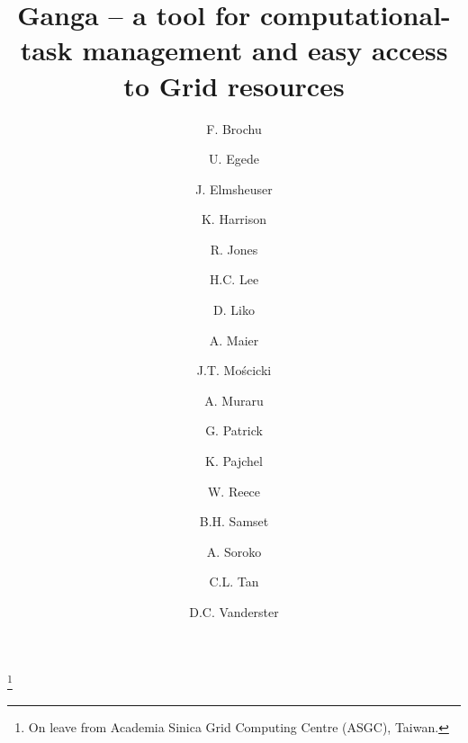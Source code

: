 \documentclass{elsart}
\def\grid {Grid\xspace}
\begin{document}
\begin{frontmatter}




\title{Ganga -- a tool for computational-task management and easy access to \grid
  resources}




\author[a:Cambridge]{F. Brochu}
\author[a:Imperial]{U. Egede}
\author[a:Munich]{J. Elmsheuser}
\author[a:Cambridge]{K. Harrison}
\author[a:Lancaster]{R. Jones}
\author[a:CERN]{H.C. Lee}
\author[a:CERN]{D. Liko}
\author[a:CERN]{A. Maier}
\author[a:CERN]{J.T. Mo{\'s}cicki}
\author[a:CERN]{A. Muraru}
\author[a:STFC]{G. Patrick}
\author[a:Oslo]{K. Pajchel}
\author[a:Imperial]{W. Reece}
\author[a:Oslo]{B.H. Samset}
\author[a:Oxford]{A. Soroko}
\author[a:Birmingham]{C.L. Tan}
\author[a:CERN]{D.C. Vanderster}

\address[a:Cambridge]{University of Cambridge, Cambridge, United Kingdom}
\address[a:Imperial]{Imperial College London, London, United Kingdom}
\address[a:Munich]{Ludwig-Maximilians-Universit\"{a}t, M\"{u}nchen, Germany}
\address[a:Lancaster]{Lancaster University, Lancaster, United Kingdom}
\address[a:CERN]{CERN, Geneva, Switzerland}
\address[a:STFC]{Science \& Technology Facilities Council, United Kingdom}
\address[a:Oxford]{University of Oxford, Oxford, United Kingdom}
\address[a:Birmingham]{University of Birmingham, Birmingham, United Kingdom}
\address[a:Oslo]{University of Oslo, Oslo, Norway}

\thanks[HurngChun]{On leave from Academia Sinica Grid Computing Centre (ASGC),
  Taiwan.}


\end{frontmatter}
\end{document}
